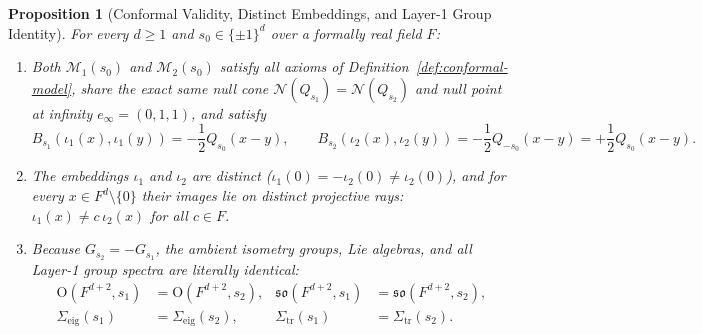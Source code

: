 \documentclass[11pt]{article}
\newtheorem{proposition}[theorem]{Proposition}
\theoremstyle{definition}
\newcommand{\Orth}{\mathrm{O}}
\newcommand{\so}{\mathfrak{so}}
\newcommand{\tr}{\mathrm{tr}}
\begin{document}
\begin{proposition}[Conformal Validity, Distinct Embeddings, and Layer-1 Group Identity]\label{prop:layer1}
For every $d \ge 1$ and $s_0 \in \{\pm 1\}^d$ over a formally real field $F$:
\begin{enumerate}
  \item Both $\mathcal{M}_1(s_0)$ and $\mathcal{M}_2(s_0)$ satisfy all axioms of Definition~\ref{def:conformal-model}, share the exact same null cone $\mathcal{N}(Q_{s_1}) = \mathcal{N}(Q_{s_2})$ and null point at infinity $e_\infty = (0, 1, 1)$, and satisfy
  \[
    B_{s_1}(\iota_1(x), \iota_1(y)) = -\frac{1}{2} Q_{s_0}(x - y), \qquad
    B_{s_2}(\iota_2(x), \iota_2(y)) = -\frac{1}{2} Q_{-s_0}(x - y) = +\frac{1}{2} Q_{s_0}(x - y).
  \]
  \item The embeddings $\iota_1$ and $\iota_2$ are distinct ($\iota_1(0) = -\iota_2(0) \neq \iota_2(0)$), and for every $x \in F^d \setminus \{0\}$ their images lie on distinct projective rays: $\iota_1(x) \neq c\,\iota_2(x)$ for all $c \in F$.
  \item Because $G_{s_2} = -G_{s_1}$, the ambient isometry groups, Lie algebras, and all Layer-1 group spectra are literally identical:
  \begin{align*}
    \Orth(F^{d+2}, s_1) &= \Orth(F^{d+2}, s_2), &
    \so(F^{d+2}, s_1) &= \so(F^{d+2}, s_2), \\
    \Sigma_{\mathrm{eig}}(s_1) &= \Sigma_{\mathrm{eig}}(s_2), &
    \Sigma_{\tr}(s_1) &= \Sigma_{\tr}(s_2).
  \end{align*}
\end{enumerate}
\end{proposition}
\end{document}
